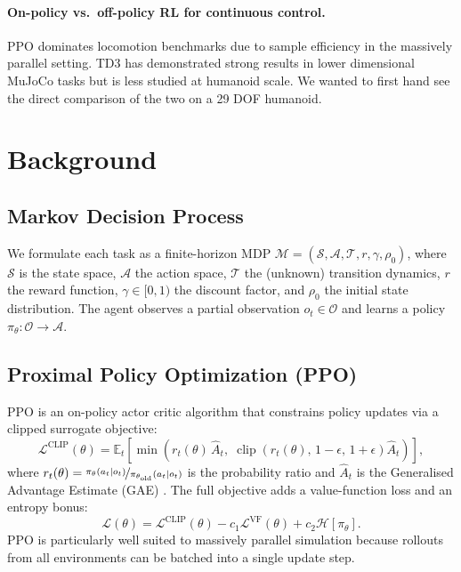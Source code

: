 \documentclass{article}
\begin{document}
\paragraph{On-policy vs.\ off-policy RL for continuous control.}
PPO \cite{schulman2017proximal} dominates locomotion benchmarks due to
sample efficiency in the massively parallel setting.
TD3 \cite{fujimoto2018addressing} has demonstrated strong results in
lower dimensional MuJoCo tasks but is less studied at humanoid scale.
We wanted to first hand see the direct comparison of the two on a 29 DOF humanoid.

\section{Background}

\subsection{Markov Decision Process}

We formulate each task as a finite-horizon MDP
$\mathcal{M} = (\mathcal{S}, \mathcal{A}, \mathcal{T}, r, \gamma, \rho_0)$,
where $\mathcal{S}$ is the state space, $\mathcal{A}$ the action space,
$\mathcal{T}$ the (unknown) transition dynamics, $r$ the reward function,
$\gamma \in [0,1)$ the discount factor, and $\rho_0$ the initial state
distribution.
The agent observes a partial observation $o_t \in \mathcal{O}$ and learns a
policy $\pi_\theta : \mathcal{O} \to \mathcal{A}$.

\subsection{Proximal Policy Optimization (PPO)}

PPO \cite{schulman2017proximal} is an on-policy actor critic algorithm that
constrains policy updates via a clipped surrogate objective:
\begin{equation}
  \mathcal{L}^{\text{CLIP}}(\theta)
  = \mathbb{E}_t\!\left[
      \min\!\left(
        r_t(\theta)\,\hat{A}_t,\;
        \operatorname{clip}\!\left(r_t(\theta),\,1-\epsilon,\,1+\epsilon\right)\hat{A}_t
      \right)
    \right],
\end{equation}
where $r_t(\theta) = \nicefrac{\pi_\theta(a_t|o_t)}{\pi_{\theta_{\text{old}}}(a_t|o_t)}$
is the probability ratio and $\hat{A}_t$ is the Generalised Advantage
Estimate (GAE) \cite{schulman2015high}.
The full objective adds a value-function loss and an entropy bonus:
\begin{equation}
  \mathcal{L}(\theta)
  = \mathcal{L}^{\text{CLIP}}(\theta)
    - c_1 \mathcal{L}^{\text{VF}}(\theta)
    + c_2 \mathcal{H}[\pi_\theta].
\end{equation}
PPO is particularly well suited to massively parallel simulation because
rollouts from all environments can be batched into a single update step.
\end{document}
